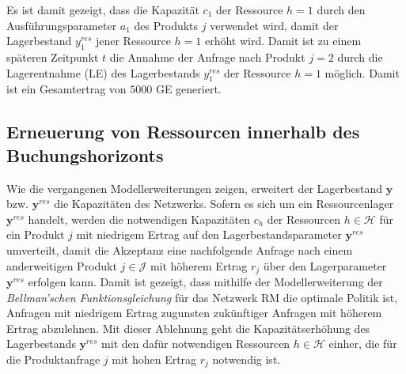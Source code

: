 Es ist damit gezeigt, dass die Kapazität $c_{1}$ der Ressource $h=1$ durch den Ausführungsparameter $a_{1}$ des Produkts $j$ verwendet wird, damit der Lagerbestand $y_{1}^{res}$ jener Ressource $h=1$ erhöht wird. Damit ist zu einem späteren Zeitpunkt $t$ die Annahme der Anfrage nach Produkt $j=2$ durch die Lagerentnahme (LE) des Lagerbestands $y_{1}^{res}$ der Ressource $h=1$ möglich. Damit ist ein Gesamtertrag von $5000$ GE generiert. 

\subsection{Erneuerung von Ressourcen innerhalb des Buchungshorizonts}

Wie die vergangenen Modellerweiterungen zeigen, erweitert der Lagerbestand $\textbf{y}$ bzw. $\textbf{y}^{res}$ die Kapazitäten des Netzwerks. Sofern es sich um ein Ressourcenlager $\textbf{y}^{res}$ handelt, werden die notwendigen Kapazitäten $c_{h}$ der Ressourcen $h\in\mathcal{H}$ für ein Produkt $j$ mit niedrigem Ertrag auf den Lagerbestandsparameter $\textbf{y}^{res}$ umverteilt, damit die Akzeptanz eine nachfolgende Anfrage nach einem anderweitigen Produkt $j\in\mathcal{J}$ mit höherem Ertrag $r_{j}$ über den Lagerparameter $\textbf{y}^{res}$ erfolgen kann. Damit ist gezeigt, dass mithilfe der Modellerweiterung der \textit{Bellman'schen Funktionsgleichung} für das Netzwerk RM die optimale Politik ist, Anfragen mit niedrigem Ertrag zugunsten zukünftiger Anfragen mit höherem Ertrag abzulehnen. Mit dieser Ablehnung geht die Kapazitätserhöhung des Lagerbestands $\textbf{y}^{res}$ mit den dafür notwendigen Ressourcen $h\in\mathcal{H}$ einher, die für die Produktanfrage $j$ mit hohen Ertrag $r_j$ notwendig ist.

